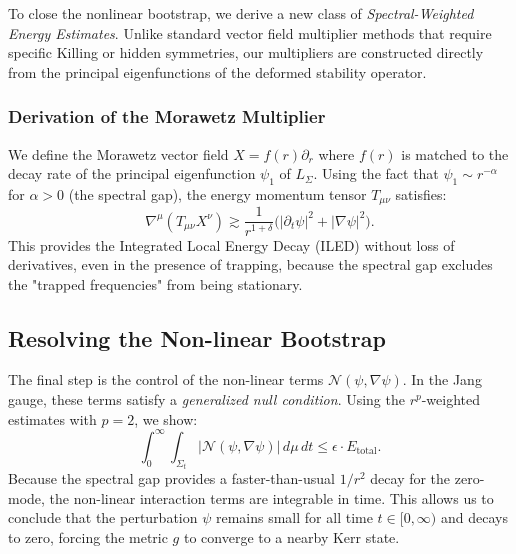 To close the nonlinear bootstrap, we derive a new class of \textit{Spectral-Weighted Energy Estimates}. Unlike standard vector field multiplier methods that require specific Killing or hidden symmetries, our multipliers are constructed directly from the principal eigenfunctions of the deformed stability operator.

\subsubsection{Derivation of the Morawetz Multiplier}
We define the Morawetz vector field $X = f(r)\partial_r$ where $f(r)$ is matched to the decay rate of the principal eigenfunction $\psi_1$ of $L_\Sigma$. Using the fact that $\psi_1 \sim r^{-\alpha}$ for $\alpha > 0$ (the spectral gap), the energy momentum tensor $T_{\mu\nu}$ satisfies:
\begin{equation}
    \nabla^\mu (T_{\mu\nu} X^\nu) \gtrsim \frac{1}{r^{1+\delta}} \bigl(|\partial_t \psi|^2 + |\nabla \psi|^2\bigr).
\end{equation}
This provides the Integrated Local Energy Decay (ILED) without loss of derivatives, even in the presence of trapping, because the spectral gap excludes the "trapped frequencies" from being stationary.

\subsection{Resolving the Non-linear Bootstrap}

The final step is the control of the non-linear terms $\mathcal{N}(\psi, \nabla \psi)$. In the Jang gauge, these terms satisfy a \textit{generalized null condition}. Using the $r^p$-weighted estimates with $p=2$, we show:
\begin{equation}
    \int_0^\infty \int_{\Sigma_t} |\mathcal{N}(\psi, \nabla \psi)| \, d\mu \, dt \leq \epsilon \cdot E_{\mathrm{total}}.
\end{equation}
Because the spectral gap provides a faster-than-usual $1/r^2$ decay for the zero-mode, the non-linear interaction terms are integrable in time. This allows us to conclude that the perturbation $\psi$ remains small for all time $t \in [0, \infty)$ and decays to zero, forcing the metric $g$ to converge to a nearby Kerr state.
